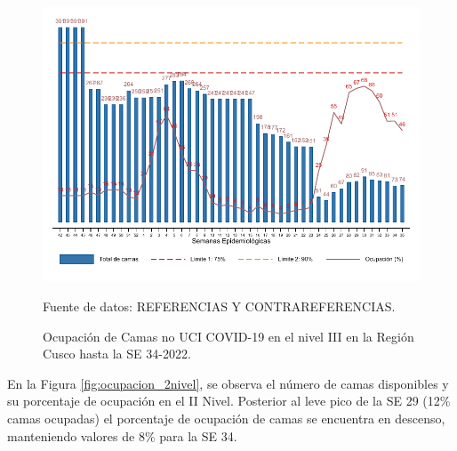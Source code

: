 \documentclass[12pt,a4paper,openany]{book}
\begin{document}
	\begin{figure}[htpb]
		\caption{Ocupación de Camas no UCI COVID-19 en el nivel III en la Región Cusco hasta la SE 34-2022.}\label{fig:ocupacion_3_nivel}
		\begin{center}
			\includegraphics[width=0.95\linewidth]{../figuras/nivel_3.pdf}
		\end{center}
		{\footnotesize {Fuente de datos: REFERENCIAS Y CONTRAREFERENCIAS.}}
	\end{figure}
	
	\clearpage
	
	En la Figura \ref{fig:ocupacion_2nivel}, se observa el número de camas disponibles y su porcentaje de ocupación en el II Nivel. Posterior al leve pico de la SE 29 (12$\%$ camas ocupadas) el porcentaje de ocupación de camas se encuentra en descenso, manteniendo valores de 8$\%$ para la SE 34.
	
\end{document}
